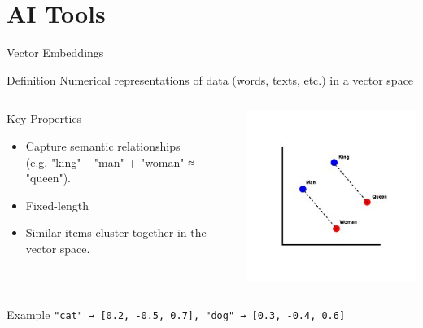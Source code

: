 \documentclass[aspectratio=169]{beamer}
\begin{document}
\section{AI Tools}
\begin{frame}{Vector Embeddings}
  \begin{block}{Definition}
  Numerical representations of data (words, texts, etc.) in a vector space
  \end{block}
  \begin{columns}
  \begin{block}{Key Properties}
  \begin{itemize}
    \item Capture semantic relationships \\(e.g. "king" – "man" + "woman" ≈ "queen").
    \item Fixed-length
    \item Similar items cluster together in the vector space.
  \end{itemize}
  \end{block}
  \includegraphics[width=\linewidth]{Word_vector_illustration}
  \end{columns}
  \begin{block}{Example}
  \texttt{"cat" → [0.2, -0.5, 0.7], "dog" → [0.3, -0.4, 0.6]}
  \end{block}
\end{frame}
\end{document}

